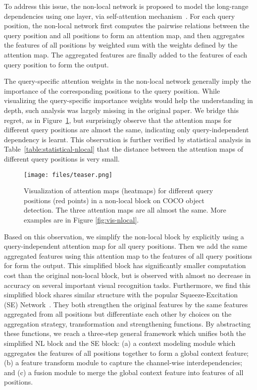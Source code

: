 \documentclass[10pt,twocolumn,letterpaper]{article}
\begin{document}
To address this issue, the non-local network \cite{wang2017non} is proposed to model the long-range dependencies using one layer, via self-attention mechanism~\cite{vaswani2017attention}.
For each query position, the non-local network first computes the pairwise relations between the query position and all positions to form an attention map, and then aggregates the features of all positions by weighted sum with the weights defined by the attention map. The aggregated features are finally added to the features of each query position to form the output.

The query-specific attention weights in the non-local network generally imply the importance of the corresponding positions to the query position. While visualizing the query-specific importance weights would help the understanding in depth, such analysis was largely missing in the original paper. We bridge this regret, as in Figure~\ref{fig:vis-teaser}, but surprisingly observe that the attention maps for different query positions are almost the same, indicating only query-independent dependency is learnt. This observation is further verified by statistical analysis in Table~\ref{table:statistical-nlocal} that the distance between the attention maps of different query positions is very small.


\begin{figure}[]
    \texttt{[image: files/teaser.png]}
	\vspace{-20pt}
	\caption{Visualization of attention maps (heatmaps) for different query positions (red points) in a non-local block on COCO object detection. The three attention maps are all almost the same. More examples are in Figure \ref{fig:vis-nlocal}.}
	\label{fig:vis-teaser}
	\vspace{-15pt}
\end{figure}


Based on this observation, we simplify the non-local block by explicitly using a query-independent attention map for all query positions. Then we add the same aggregated features using this attention map to the features of all query positions for form the output. This simplified block has significantly smaller computation cost than the original non-local block, but is observed with almost no decrease in accuracy on several important visual recognition tasks.
Furthermore, we find this simplified block shares similar structure with the popular Squeeze-Excitation (SE) Network~\cite{hu2018senet}. They both strengthen the original features by the same features aggregated from all positions but differentiate each other by choices on the aggregation strategy, transformation and strengthening functions. By abstracting these functions, we reach a three-step general framework which unifies both the simplified NL block and the SE block: (a) a {context modeling} module which aggregates the features of all positions together to form a global context feature; (b) a feature {transform} module to capture the channel-wise interdependencies; and (c) a {fusion} module to merge the global context feature into features of all positions.
\end{document}
